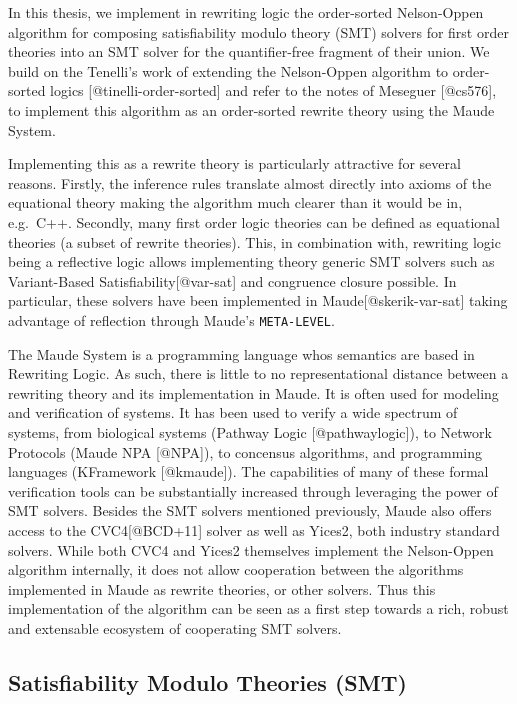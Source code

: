 \documentclass[]{article}
\begin{document}
In this thesis, we implement in rewriting logic the order-sorted
Nelson-Oppen algorithm for composing satisfiability modulo theory (SMT)
solvers for first order theories into an SMT solver for the
quantifier-free fragment of their union. We build on the Tenelli's work
of extending the Nelson-Oppen algorithm to order-sorted logics
{[}@tinelli-order-sorted{]} and refer to the notes of Meseguer
{[}@cs576{]}, to implement this algorithm as an order-sorted rewrite
theory using the Maude System.

Implementing this as a rewrite theory is particularly attractive for
several reasons. Firstly, the inference rules translate almost directly
into axioms of the equational theory making the algorithm much clearer
than it would be in, e.g.~C++. Secondly, many first order logic theories
can be defined as equational theories (a subset of rewrite theories).
This, in combination with, rewriting logic being a reflective logic
allows implementing theory generic SMT solvers such as Variant-Based
Satisfiability{[}@var-sat{]} and congruence closure possible. In
particular, these solvers have been implemented in
Maude{[}@skerik-var-sat{]} taking advantage of reflection through
Maude's \texttt{META-LEVEL}.

The Maude System is a programming language whos semantics are based in
Rewriting Logic. As such, there is little to no representational
distance between a rewriting theory and its implementation in Maude. It
is often used for modeling and verification of systems. It has been used
to verify a wide spectrum of systems, from biological systems (Pathway
Logic {[}@pathwaylogic{]}), to Network Protocols (Maude NPA {[}@NPA{]}),
to concensus algorithms, and programming languages (KFramework
{[}@kmaude{]}). The capabilities of many of these formal verification
tools can be substantially increased through leveraging the power of SMT
solvers. Besides the SMT solvers mentioned previously, Maude also offers
access to the CVC4{[}@BCD+11{]} solver as well as Yices2, both industry
standard solvers. While both CVC4 and Yices2 themselves implement the
Nelson-Oppen algorithm internally, it does not allow cooperation between
the algorithms implemented in Maude as rewrite theories, or other
solvers. Thus this implementation of the algorithm can be seen as a
first step towards a rich, robust and extensable ecosystem of
cooperating SMT solvers.

\hypertarget{satisfiability-modulo-theories-smt}{%
\subsection{Satisfiability Modulo Theories
(SMT)}\label{satisfiability-modulo-theories-smt}}
\end{document}
